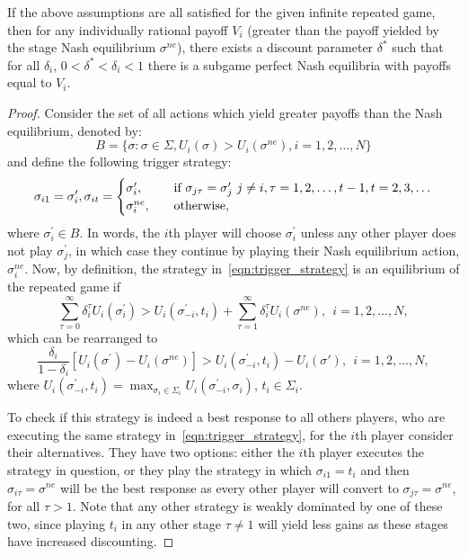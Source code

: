 \begin{theorem}\label{thm:Folk}
    If the above assumptions are all satisfied for the given infinite repeated
    game, then for any individually rational payoff \(V_{i}\) (greater than the
    payoff yielded by the stage Nash equilibrium \(\sigma^{ne}\)), there exists
    a discount parameter \(\delta^{*}\) such that for all \(\delta_{i}\), \(0 <
    \delta^{*} < \delta_{i} < 1\) there is a subgame perfect Nash equilibria
    with payoffs equal to \(V_{i}\).
\end{theorem}

\begin{proof}
    Consider the set of all actions which yield greater payoffs than the Nash
    equilibrium, denoted by:
    \[
        B = \{\sigma : \sigma \in \Sigma, U_{i}(\sigma) > U_{i}(\sigma^{ne}), i = 1, 2, \ldots, N\}
    \]
    and define the following trigger strategy:
    \begin{equation}
        \sigma_{i1} = \sigma_{i}^{\prime}, \newline
        \sigma_{it} = \begin{cases}
            \sigma_{i}^{\prime}, & \quad \text{if } \sigma_{j\tau}=\sigma_{j}^{\prime} \ j \ne i, \tau=1, 2, \ldots, t-1, t=2, 3, \ldots \\
            \sigma_{i}^{ne}, & \quad \text{otherwise},
        \end{cases}
    \end{equation}\label{eqn:trigger_strategy}
    where \(\sigma_{i}^{\prime} \in B\). In words, the \(i\)th player will choose \(\sigma_{i}^{\prime}\) unless any
    other player does not play \( \sigma_{j}^{\prime}\), in which case they
    continue by playing their Nash equilibrium action, \(\sigma_{i}^{ne}\). Now,
    by definition, the strategy in~\ref{eqn:trigger_strategy} is an equilibrium
    of the repeated game if 
    \[
        \sum_{\tau=0}^{\infty}{\delta_{i}^{\tau}U_{i}(\sigma_{i}^{\prime})} > U_{i}(\sigma_{-i}^{\prime}, t_{i}) + \sum_{\tau=1}^{\infty}{\delta_{i}^{\tau}U_{i}(\sigma^{ne})}, \ \ i=1, 2, \ldots, N,
    \]
    which can be rearranged to 
    \[
        \frac{\delta_{i}}{1-\delta_{i}}[U_{i}(\sigma^{\prime}) - U_{i}(\sigma^{ne})] > U_{i}(\sigma_{-i}^{\prime}, t_{i}) - U_{i}(\sigma{\prime}), \ \ i=1, 2, \ldots, N,
    \]
    where \(U_{i}(\sigma_{-i}^{\prime}, t_{i}) = \max_{\sigma_{i} \in
    \Sigma_{i}}{U_{i}(\sigma_{-i}^{\prime}, \sigma_{i})}\), \(t_{i} \in
    \Sigma_{i}\).

    To check if this strategy is indeed a best response to all others players,
    who are executing the same strategy in~\ref{eqn:trigger_strategy}, for the
    \(i\)th player consider their alternatives. They have two options: either
    the \(i\)th player executes the strategy in question, or they play the
    strategy in which \(\sigma_{i1} = t_{i}\) and then \(\sigma_{i\tau} =
    \sigma^{ne}\) will be the best response as every other player will convert
    to \(\sigma_{j\tau} = \sigma^{ne}\), for all \(\tau > 1\). Note that any
    other strategy is weakly dominated by one of these two, since playing
    \(t_{i}\) in any other stage \(\tau \ne 1\) will yield less gains as these
    stages have increased discounting.


\end{proof}

